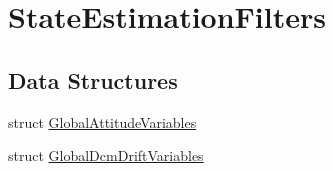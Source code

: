 \hypertarget{group___state_estimation_filters}{\section{\-State\-Estimation\-Filters}
\label{group___state_estimation_filters}
}
\subsection*{\-Data \-Structures}
\begin{DoxyCompactItemize}
\item 
struct \hyperlink{struct_global_attitude_variables}{\-Global\-Attitude\-Variables}
\item 
struct \hyperlink{struct_global_dcm_drift_variables}{\-Global\-Dcm\-Drift\-Variables}
\end{DoxyCompactItemize}
